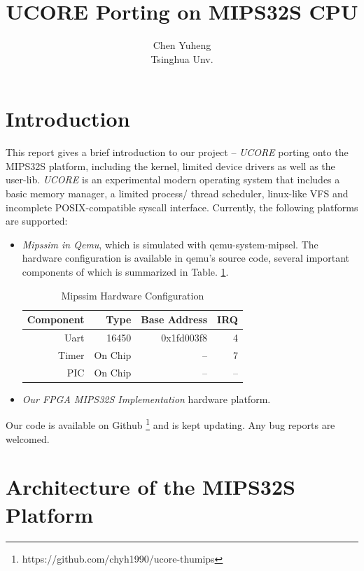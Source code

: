 \documentclass[a4paper]{article}
\begin{document}
\title{UCORE Porting on MIPS32S CPU}
\author{Chen Yuheng\\ Tsinghua Unv.}
\maketitle

\section{Introduction}
This report gives a brief introduction to our project -- 
\emph{UCORE} porting onto the MIPS32S platform, including the kernel, limited
device drivers as well as the user-lib. \emph{UCORE} is an experimental 
modern operating system that includes a basic memory manager, a limited process/
thread scheduler, linux-like VFS and incomplete POSIX-compatible syscall 
interface.  Currently, the following platforms are supported:
 \begin{itemize}
   \item \emph{Mipssim in Qemu}, which is simulated with qemu-system-mipsel.
     The hardware configuration is available in qemu's source code,
     several important components of which is summarized in
     Table. \ref{tab:mipssim}.
     \begin{table}[h]
       \centering
       \begin{tabular}{|r|rrr|}
         \hline
         Component & Type & Base Address &  IRQ \\
         \hline
         Uart & 16450 & 0x1fd003f8 & 4 \\
         Timer & On Chip & -- & 7 \\
         PIC   & On Chip & -- & -- \\
         \hline
       \end{tabular}
       \caption{Mipssim Hardware Configuration}
       \label{tab:mipssim}
     \end{table}

   \item \emph{Our FPGA MIPS32S Implementation} hardware platform.
 \end{itemize}

Our code is available on Github
\footnote{https://github.com/chyh1990/ucore-thumips}
 and is kept updating. Any bug reports are welcomed.

\section{Architecture of the MIPS32S Platform}
\end{document}
